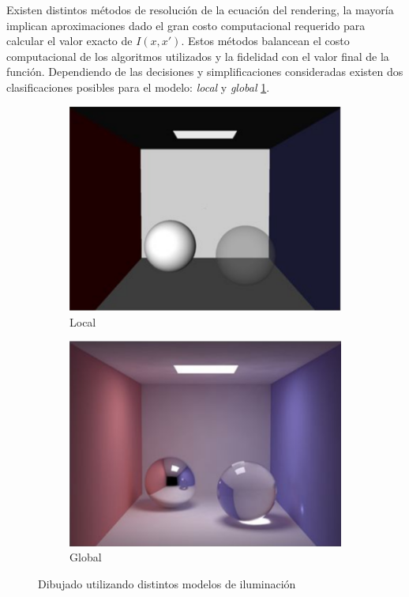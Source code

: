 Existen distintos métodos de resolución de la ecuación del rendering, la mayoría implican aproximaciones dado el gran costo computacional requerido para calcular el valor exacto de $I(x,x')$. Estos métodos balancean el costo computacional de los algoritmos utilizados y la fidelidad con el valor final de la función. Dependiendo de las decisiones y simplificaciones consideradas existen dos clasificaciones posibles para el modelo: \textit{local} y \textit{global} \ref{local-vs-global-img}.

\vspace{5mm}
\begin{figure}[h]
	\begin{subfigure}{0.5\textwidth}
		  	\centering
   		 	\includegraphics[width=1\linewidth]{assets/local}
   		 	\caption{Local}
   	\end{subfigure}
    \begin{subfigure}{0.5\textwidth}
    	\centering
    	\includegraphics[width=1\linewidth]{assets/global}
    	\caption{Global}
    \end{subfigure}
    \caption{Dibujado utilizando distintos modelos de iluminación}
    \label{local-vs-global-img}
\end{figure}

